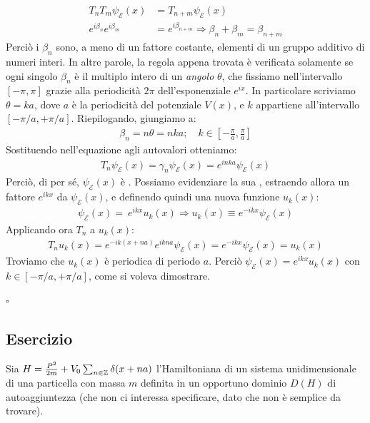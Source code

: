 \documentclass[../../FisicaTeorica.tex]{subfiles}
\begin{document}
\begin{align*}
T_nT_m\psi_\mathcal{E}(x) &= T_{n+m}\psi_\mathcal{E}(x)\\
e^{i\beta_n} e^{i\beta_m} &= e^{i\beta_{n+m}} \Rightarrow \beta_{n}+\beta_m = \beta_{n+m} 
\end{align*}
Perciò i $\beta_n$ sono, a meno di un fattore costante, elementi di un gruppo additivo di numeri interi. In altre parole, la regola appena trovata è verificata solamente se ogni singolo $\beta_n$ è il multiplo intero di un \textit{angolo} $\theta$, che fissiamo nell'intervallo $[-\pi,\pi]$ grazie alla periodicità $2\pi$ dell'esponenziale $e^{ix}$. In particolare scriviamo $\theta = ka$, dove $a$ è la periodicità del potenziale $V(x)$, e $k$ appartiene all'intervallo $[-\pi/a, +\pi/a]$. Riepilogando, giungiamo a:
\begin{align*}
 \beta_n = n\theta = nka; \quad k\in \left[-\frac{\pi}{a}, \frac{\pi}{a}\right]
\end{align*}
Sostituendo nell'equazione agli autovalori otteniamo:
\begin{align*}
T_n\psi_\mathcal{E}(x)=\gamma_n\psi_\mathcal{E}(x) = e^{inka}\psi_\mathcal{E}(x)
\end{align*}
Perciò, di per sé, $\psi_\mathcal{E}(x)$ è . Possiamo evidenziare la sua , estraendo allora un fattore $e^{ikx}$ da $\psi_\mathcal{E}(x)$, e definendo quindi una nuova funzione $u_k(x)$:
\begin{align*}
\psi_\mathcal{E}(x) =\ e^{ikx}u_k(x)\Rightarrow 
u_k(x) \equiv e^{-ikx}\psi_\mathcal{E}(x)
\end{align*}
Applicando ora $T_n$ a $u_k(x)$:
\begin{align*}
T_n u_k(x) = e^{-ik(x+na)} e^{ikna} \psi_\mathcal{E}(x) = e^{-ikx}\psi_\mathcal{E}(x) = u_k(x)
\end{align*}
Troviamo che $u_k(x)$ è periodica di periodo $a$. Perciò $\psi_\mathcal{E}(x) = e^{ikx} u_k(x)$ con $k \in [-\pi/a, +\pi/a]$, come si voleva dimostrare.
\begin{flushright}
$\square$
\end{flushright}

\subsection{Esercizio \theEsercizio} 
Sia $H=\frac{P^2}{2m} + V_0 \sum_{n\in \mathbb{Z}} \delta(x+na)$ l'Hamiltoniana di un sistema unidimensionale di una particella con massa $m$ definita in un opportuno dominio $D(H)$ di autoaggiuntezza (che non ci interessa specificare, dato che non è semplice da trovare).\\
\end{document}
